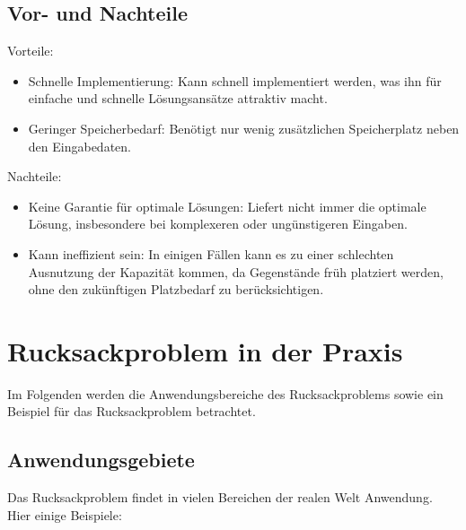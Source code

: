 \documentclass[12pt]{report}
\begin{document}
\section{Vor- und Nachteile}
Vorteile: 
\begin{itemize}
	\item Schnelle Implementierung: Kann schnell implementiert werden, was ihn für einfache und schnelle Lösungsansätze attraktiv macht.
	\item Geringer Speicherbedarf: Benötigt nur wenig zusätzlichen Speicherplatz neben den Eingabedaten.
\end{itemize}

Nachteile:
\begin{itemize}
	\item Keine Garantie für optimale Lösungen: Liefert nicht immer die optimale Lösung, insbesondere bei komplexeren oder ungünstigeren Eingaben.
	\item Kann ineffizient sein: In einigen Fällen kann es zu einer schlechten Ausnutzung der Kapazität kommen, da Gegenstände früh platziert werden, ohne den zukünftigen Platzbedarf zu berücksichtigen.
\end{itemize}

\pagebreak
\chapter{Rucksackproblem in der Praxis}
	Im Folgenden werden die Anwendungsbereiche des Rucksackproblems sowie ein Beispiel für das Rucksackproblem betrachtet.
	
	\section{Anwendungsgebiete}
	Das Rucksackproblem findet in vielen Bereichen der realen Welt Anwendung. Hier einige Beispiele:
	
\end{document}
